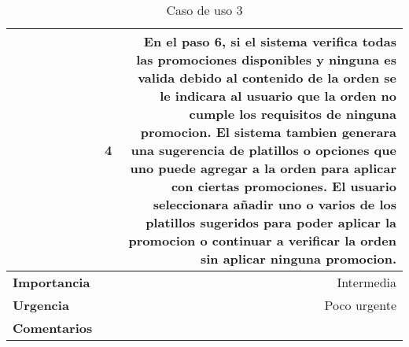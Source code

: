 \documentclass[conference]{IEEEtran}
\begin{document}
\begin{table}[H]
\begin{adjustbox}{width=0.47\textwidth}
\begin{tabular}{|p{11.215em}|r|r|}
\cmidrule{2-3}    \multicolumn{1}{|c|}{} & \multicolumn{1}{c|}{4} & \multicolumn{1}{p{32em}|}{En el paso 6, si el sistema verifica todas las promociones disponibles y ninguna es valida debido al contenido de la orden se le indicara al usuario que la orden no cumple los requisitos de ninguna promocion. El sistema tambien generara una sugerencia de platillos o opciones que uno puede agregar a la orden para aplicar con ciertas promociones. El usuario seleccionara  añadir uno o varios de los platillos sugeridos para poder aplicar la promocion o continuar a verificar la orden sin aplicar ninguna promocion.} \\
    \midrule
    \textbf{Importancia} & \multicolumn{2}{p{37.43em}|}{Intermedia} \\
    \midrule
    \textbf{Urgencia} & \multicolumn{2}{p{37.43em}|}{Poco urgente} \\
    \midrule
    \textbf{Comentarios} & \multicolumn{2}{r|}{} \\
    \bottomrule
    \end{tabular}%
    \end{adjustbox}
    \vspace{0.3cm}
    \caption{Caso de uso 3}
  \label{tab:addlabel}%
\end{table}%
\end{document}
